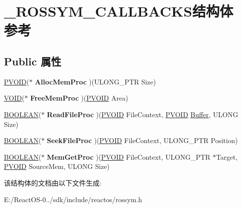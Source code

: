 \hypertarget{struct___r_o_s_s_y_m___c_a_l_l_b_a_c_k_s}{}\section{\+\_\+\+R\+O\+S\+S\+Y\+M\+\_\+\+C\+A\+L\+L\+B\+A\+C\+K\+S结构体 参考}
\label{struct___r_o_s_s_y_m___c_a_l_l_b_a_c_k_s}
\subsection*{Public 属性}
\begin{DoxyCompactItemize}
\item 
\mbox{\label{struct___r_o_s_s_y_m___c_a_l_l_b_a_c_k_s_a33406a1a8e79538e4e44588b32a5dc45}} 
\hyperlink{interfacevoid}{P\+V\+O\+ID}($\ast$ {\bfseries Alloc\+Mem\+Proc} )(U\+L\+O\+N\+G\+\_\+\+P\+TR Size)
\item 
\mbox{\label{struct___r_o_s_s_y_m___c_a_l_l_b_a_c_k_s_a198ea3e2e9098a73e1b050aae7e6bff2}} 
\hyperlink{interfacevoid}{V\+O\+ID}($\ast$ {\bfseries Free\+Mem\+Proc} )(\hyperlink{interfacevoid}{P\+V\+O\+ID} Area)
\item 
\mbox{\label{struct___r_o_s_s_y_m___c_a_l_l_b_a_c_k_s_a2863ee0d18bbb1d40289ee0e06264878}} 
\hyperlink{_processor_bind_8h_a112e3146cb38b6ee95e64d85842e380a}{B\+O\+O\+L\+E\+AN}($\ast$ {\bfseries Read\+File\+Proc} )(\hyperlink{interfacevoid}{P\+V\+O\+ID} File\+Context, \hyperlink{interfacevoid}{P\+V\+O\+ID} \hyperlink{class_buffer}{Buffer}, U\+L\+O\+NG Size)
\item 
\mbox{\label{struct___r_o_s_s_y_m___c_a_l_l_b_a_c_k_s_a52f29dc37d9e23ee9a68afbcbdcd33c7}} 
\hyperlink{_processor_bind_8h_a112e3146cb38b6ee95e64d85842e380a}{B\+O\+O\+L\+E\+AN}($\ast$ {\bfseries Seek\+File\+Proc} )(\hyperlink{interfacevoid}{P\+V\+O\+ID} File\+Context, U\+L\+O\+N\+G\+\_\+\+P\+TR Position)
\item 
\mbox{\label{struct___r_o_s_s_y_m___c_a_l_l_b_a_c_k_s_aeec2936f354944750cd0f5e91a1164bc}} 
\hyperlink{_processor_bind_8h_a112e3146cb38b6ee95e64d85842e380a}{B\+O\+O\+L\+E\+AN}($\ast$ {\bfseries Mem\+Get\+Proc} )(\hyperlink{interfacevoid}{P\+V\+O\+ID} File\+Context, U\+L\+O\+N\+G\+\_\+\+P\+TR $\ast$Target, \hyperlink{interfacevoid}{P\+V\+O\+ID} Source\+Mem, U\+L\+O\+NG Size)
\end{DoxyCompactItemize}


该结构体的文档由以下文件生成\+:\begin{DoxyCompactItemize}
\item 
E\+:/\+React\+O\+S-\/0../sdk/include/reactos/rossym.\+h\end{DoxyCompactItemize}
